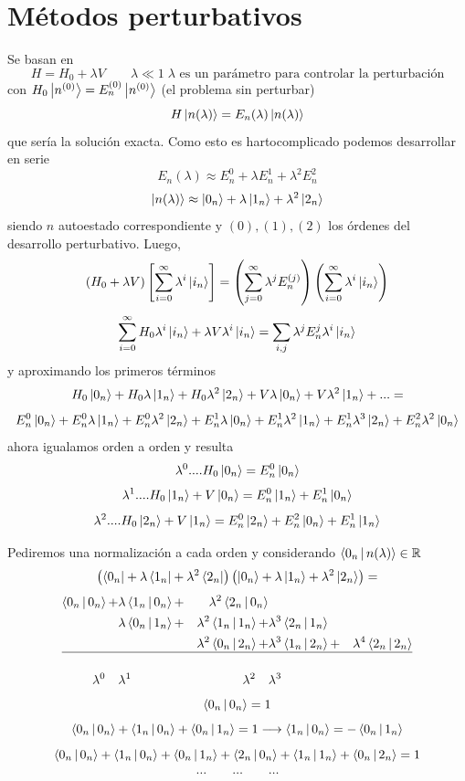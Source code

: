 \documentclass[10pt,oneside]{CBFT_book}
\begin{document}
\chapter{Métodos perturbativos}

Se basan en 
\[
	H = H_0 + \lambda V \qquad \lambda \ll 1 \; \text{$\lambda$ es un parámetro para controlar
	la perturbación}
\]
con $ H_0\Ket{n^{(0)}} = E_n^{(0)}\Ket{n^{(0)}}$ (el problema sin perturbar)
\[
	H \Ket{n(\lambda)} = E_n(\lambda) \Ket{n(\lambda)}
\]
que sería la solución exacta.
Como esto es hartocomplicado podemos desarrollar en serie 
\[
	E_n(\lambda) \approx E_n^0 + \lambda E_n^1 + \lambda^2 E_n^2 
\]
\[
	\Ket{n(\lambda)} \approx \Ket{0_n} + \lambda \Ket{1_n} + \lambda^2  \Ket{2_n}
\]
siendo $n$ autoestado correspondiente y $(0),(1),(2)$ los órdenes del desarrollo perturbativo.
Luego,
\[
	\left( H_0 + \lambda V \right)\left[ \sum_{i=0}^{\infty} \lambda^i\Ket{i_n} \right] =
	\left(\sum_{j=0}^{\infty} \lambda^j E_n^{(j)}\right)\left(\sum_{i=0}^{\infty} \lambda^i\Ket{i_n}\right)
\]
\[
	\sum_{i=0}^\infty H_0 \lambda^i \Ket{i_n} + \lambda V \lambda^i \Ket{i_n} =
	\sum_{i,j} \lambda^j E_n^j \lambda^i \Ket{i_n}
\]
y aproximando los primeros términos 
\[
	H_0\Ket{0_n} + H_0\lambda\Ket{1_n} + H_0\lambda^2\Ket{2_n} + V\lambda\Ket{0_n} +
	V\lambda^2\Ket{1_n}+... =
\]
\[
	E_n^0\Ket{0_n} + E_n^0\lambda\Ket{1_n} + E_n^0\lambda^2\Ket{2_n} +
	E_n^1\lambda\Ket{0_n} + E_n^1\lambda^2\Ket{1_n} + E_n^1\lambda^3\Ket{2_n} + 
	E_n^2\lambda^2\Ket{0_n}
\]
ahora igualamos orden a orden y resulta 
\[
	\lambda^0 .... H_0\Ket{0_n}  = E_n^0\Ket{0_n}
\]
\[
	\lambda^1 .... H_0\Ket{1_n} + V\Ket{0_n} = 
	E_n^0\Ket{1_n} + E_n^1\Ket{0_n} 
\]
\[
	\lambda^2 .... H_0\Ket{2_n} + V\Ket{1_n} =
	E_n^0\Ket{2_n} + E_n^2\Ket{0_n} + E_n^1\Ket{1_n}
\]

Pediremos una normalización a cada orden y considerando $ \Braket{0_n|n(\lambda)} \in \mathbb{R}$
\[
	\left( \Bra{0_n} + \lambda\Bra{1_n} + \lambda^2\Bra{2_n} \right)
	\left( \Ket{0_n} + \lambda\Ket{1_n} + \lambda^2\Ket{2_n} \right) =
\]
\[
\begin{aligned}
 \Braket{0_n|0_n} +& \lambda\Braket{1_n|0_n} +& \lambda^2 \Braket{2_n|0_n} &  & & \\
 & \lambda\Braket{0_n|1_n} +& \lambda^2\Braket{1_n|1_n} +& \lambda^3\Braket{2_n|1_n}& & \\
 & & \lambda^2\Braket{0_n|2_n} +& \lambda^3\Braket{1_n|2_n} +& \lambda^4\Braket{2_n|2_n} & \\
 \hline \\
 \lambda^0 \quad & \lambda^1 \quad & \lambda^2 \quad & \lambda^3 \quad & &
\end{aligned}
\]
\[
	\Braket{0_n|0_n} = 1
\]
\[
	\Braket{0_n|0_n} + \Braket{1_n|0_n} + \Braket{0_n|1_n} = 1 \longrightarrow 
	\Braket{1_n|0_n} = -\Braket{0_n|1_n}
\]
\[
	\Braket{0_n|0_n} + \Braket{1_n|0_n} + \Braket{0_n|1_n} + \Braket{2_n|0_n} + \Braket{1_n|1_n} +
	\Braket{0_n|2_n} = 1
\]
\[
	\ldots \qquad \ldots \qquad \ldots
\]
\end{document}
